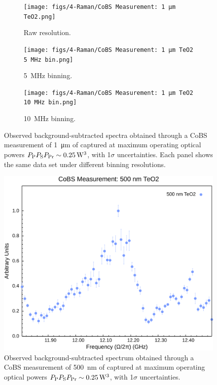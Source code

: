 \begin{figure}[t]
  \centering
  \begin{subfigure}[b]{0.85\textwidth}
    \centering
    \hspace{-2em}\texttt{[image: figs/4-Raman/CoBS Measurement: 1 μm TeO2.png]}
    \caption{Raw resolution.}
    \label{fig:Raman:1umTeO2Raw}
  \end{subfigure}

  \vspace{1em}

  \begin{subfigure}[b]{0.49\textwidth}
    \centering
    \texttt{[image: figs/4-Raman/CoBS Measurement: 1 μm TeO2 5 MHz bin.png]}
    \caption{\SI{5}{\mega\hertz} binning.}
    \label{fig:Raman:1umTeO25MHzBin}
  \end{subfigure}
  \hfill
  \begin{subfigure}[b]{0.49\textwidth}
    \centering
    \texttt{[image: figs/4-Raman/CoBS Measurement: 1 μm TeO2 10 MHz bin.png]}
    \caption{\SI{10}{\mega\hertz} binning.}
    \label{fig:Raman:1umTeO10MHzBin}
  \end{subfigure}

  \caption{Observed background-subtracted spectra obtained through a \ac{CoBS} measurement of \SI{1}{\micro\meter} of  captured at maximum operating optical powers \(P_{\rm P}P_{\rm S}P_{\rm Pr} \sim \SI{0.25}{\cubic\watt}\), with 1\(\sigma\) uncertainties. Each panel shows the same data set under different binning resolutions.}
  \label{fig:Raman:1umTeO2_combined}
\end{figure}

\begin{figure}[t]
  \centering
  \hspace{-2em}\includegraphics[width=\textwidth]{figs/4-Raman/CoBS Measurement: 500 nm TeO2.png}
  \caption{Observed background-subtracted spectrum obtained through a \ac{CoBS} measurement of \SI{500}{\nano\meter} of  captured at maximum operating optical powers \(P_{\rm P}P_{\rm S}P_{\rm Pr} \sim \SI{0.25}{\cubic\watt}\), with 1\(\sigma\) uncertainties.}
  \label{fig:Raman:500nmTeO2}
\end{figure}

